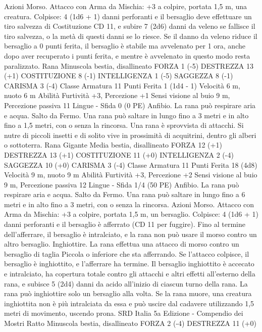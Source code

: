 \begin{multicols}{2}
Azioni
Morso. Attacco con Arma da Mischia: +3 a colpire, portata 1,5
m, una creatura.
Colpisce: 4 (1d6 + 1) danni perforanti e il bersaglio deve
effettuare un tiro salvezza di Costituzione CD 11, e subire 7
(2d6) danni da veleno se fallisce il tiro salvezza, o la metà di
questi danni se lo riesce. Se il danno da veleno riduce il bersaglio
a 0 punti ferita, il bersaglio è stabile ma avvelenato per 1 ora,
anche dopo aver recuperato i punti ferita, e mentre è avvelenato
in questo modo resta paralizzato.
Rana
Minuscola bestia, disallineato
FORZA 1 (-5)
DESTREZZA 13 (+1)
COSTITUZIONE 8 (-1)
INTELLIGENZA 1 (-5)
SAGGEZZA 8 (-1)
CARISMA 3 (-4)
Classe Armatura 11
Punti Ferita 1 (1d4 - 1)
Velocità 6 m, nuoto 6 m
Abilità Furtività +3, Percezione +1
Sensi visione al buio 9 m, Percezione passiva 11
Lingue -
Sfida 0 (0 PE)
Anfibio. La rana può respirare aria e acqua.
Salto da Fermo. Una rana può saltare in lungo fino a 3 metri e in
alto fino a 1,5 metri, con o senza la rincorsa.
Una rana è sprovvista di attacchi. Si nutre di piccoli
insetti e di solito vive in prossimità di acquitrini, dentro
gli alberi o sottoterra.
Rana Gigante
Media bestia, disallineato
FORZA 12 (+1)
DESTREZZA 13 (+1)
COSTITUZIONE 11 (+0)
INTELLIGENZA 2 (-4)
SAGGEZZA 10 (+0)
CARISMA 3 (-4)
Classe Armatura 11
Punti Ferita 18 (4d8)
Velocità 9 m, nuoto 9 m
Abilità Furtività +3, Percezione +2
Sensi visione al buio 9 m, Percezione passiva 12
Lingue -
Sfida 1/4 (50 PE)
Anfibio. La rana può respirare aria e acqua.
Salto da Fermo. Una rana può saltare in lungo fino a 6 metri e in
alto fino a 3 metri, con o senza la rincorsa.
Azioni
Morso. Attacco con Arma da Mischia: +3 a colpire, portata 1,5
m, un bersaglio.
Colpisce: 4 (1d6 + 1) danni perforanti e il bersaglio è afferrato
(CD 11 per fuggire). Fino al termine dell’afferrare, il bersaglio è
intralciato, e la rana non può usare il morso contro un altro
bersaglio.
Inghiottire. La rana effettua una attacco di morso contro un
bersaglio di taglia Piccola o inferiore che sta afferrando. Se
l’attacco colpisce, il bersaglio è inghiottito, e l’afferrare ha
termine. Il bersaglio inghiottito è accecato e intralciato, ha
copertura totale contro gli attacchi e altri effetti all’esterno della
rana, e subisce 5 (2d4) danni da acido all’inizio di ciascun turno
della rana. La rana può inghiottire solo un bersaglio alla volta.
Se la rana muore, una creatura inghiottita non è più intralciata da
essa e può uscire dal cadavere utilizzando 1,5 metri di
movimento, uscendo prona.
SRD Italia 5a Edizione - Compendio dei Mostri
Ratto
Minuscola bestia, disallineato
FORZA 2 (-4)
DESTREZZA 11 (+0)

\end{multicols}
